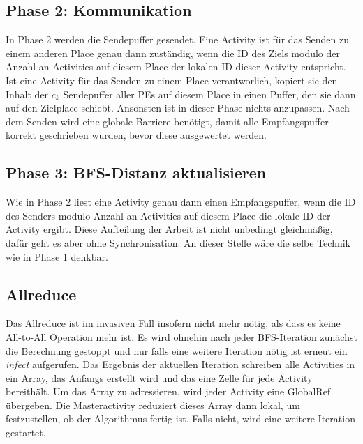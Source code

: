 \subsection{Phase 2: Kommunikation} %
\label{sub:parallel_phase_2_invasive}
In Phase 2 werden die Sendepuffer gesendet. Eine Activity ist für das Senden zu einem anderen Place genau dann zuständig, wenn die ID des Ziels modulo der Anzahl an Activities auf diesem Place der lokalen ID dieser Activity entspricht. Ist eine Activity für das Senden zu einem Place verantworlich, kopiert sie den Inhalt der $c_k$ Sendepuffer aller PEs auf diesem Place in einen Puffer, den sie dann auf den Zielplace schiebt. Ansonsten ist in dieser Phase nichts anzupassen. Nach dem Senden wird eine globale Barriere benötigt, damit alle Empfangspuffer korrekt geschrieben wurden, bevor diese ausgewertet werden.

\subsection{Phase 3: BFS-Distanz aktualisieren} %
\label{sub:phase_3_invasive}
Wie in Phase 2 liest eine Activity genau dann einen Empfangspuffer, wenn die ID des Senders modulo Anzahl an Activities auf diesem Place die lokale ID der Activity ergibt. Diese Aufteilung der Arbeit ist nicht unbedingt gleichmäßig, dafür geht es aber ohne Synchronisation. An dieser Stelle wäre die selbe Technik wie in Phase 1 denkbar.

\subsection{Allreduce} %
\label{sub:allreduce_invasive}
Das Allreduce ist im invasiven Fall insofern nicht mehr nötig, als dass es keine All-to-All Operation mehr ist. Es wird ohnehin nach jeder BFS-Iteration zunächst die Berechnung gestoppt und nur falls eine weitere Iteration nötig ist erneut ein \textit{infect} aufgerufen. Das Ergebnis der aktuellen Iteration schreiben alle Activities in ein Array, das Anfangs erstellt wird und das eine Zelle für jede Activity bereithält. Um das Array zu adressieren, wird jeder Activity eine GlobalRef übergeben. Die Masteractivity reduziert dieses Array dann lokal, um festzustellen, ob der Algorithmus fertig ist. Falls nicht, wird eine weitere Iteration gestartet.


